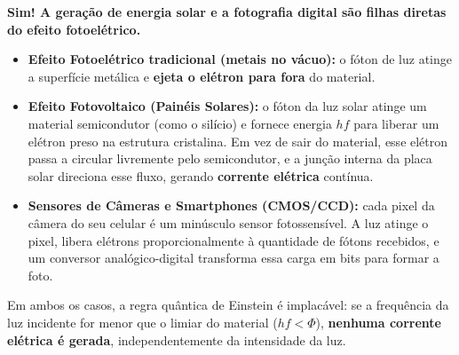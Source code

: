 \documentclass[
  brazilian,
]{report}
\providecommand{\tightlist}{%
  \setlength{\itemsep}{0pt}\setlength{\parskip}{0pt}}
\begin{document}
\begin{tcolorbox}[enhanced jigsaw, arc=.35mm, bottomrule=.15mm, bottomtitle=1mm, breakable, colback=white, colbacktitle=quarto-callout-tip-color!10!white, colframe=quarto-callout-tip-color-frame, coltitle=black, left=2mm, leftrule=.75mm, opacityback=0, opacitybacktitle=0.6, rightrule=.15mm, title=\textcolor{quarto-callout-tip-color}{\faLightbulb}\hspace{0.5em}{☀️ Aplicação Prática: É assim que funcionam os painéis solares e as
câmeras digitais?}, titlerule=0mm, toprule=.15mm, toptitle=1mm]

\textbf{Sim! A geração de energia solar e a fotografia digital são
filhas diretas do efeito fotoelétrico.}

\begin{itemize}
\tightlist
\item
  \textbf{Efeito Fotoelétrico tradicional (metais no vácuo):} o fóton de
  luz atinge a superfície metálica e \textbf{ejeta o elétron para fora}
  do material.
\item
  \textbf{Efeito Fotovoltaico (Painéis Solares):} o fóton da luz solar
  atinge um material semicondutor (como o silício) e fornece energia
  \(hf\) para liberar um elétron preso na estrutura cristalina. Em vez
  de sair do material, esse elétron passa a circular livremente pelo
  semicondutor, e a junção interna da placa solar direciona esse fluxo,
  gerando \textbf{corrente elétrica} contínua.
\item
  \textbf{Sensores de Câmeras e Smartphones (CMOS/CCD):} cada pixel da
  câmera do seu celular é um minúsculo sensor fotossensível. A luz
  atinge o pixel, libera elétrons proporcionalmente à quantidade de
  fótons recebidos, e um conversor analógico-digital transforma essa
  carga em bits para formar a foto.
\end{itemize}

Em ambos os casos, a regra quântica de Einstein é implacável: se a
frequência da luz incidente for menor que o limiar do material
(\(hf < \Phi\)), \textbf{nenhuma corrente elétrica é gerada},
independentemente da intensidade da luz.

\end{tcolorbox}
\end{document}

